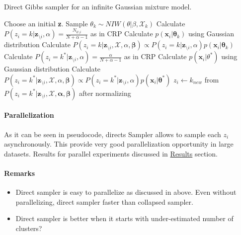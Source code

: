 \documentclass[a4paper]{article}
\begin{document}
\begin{algorithm}
  \caption{Direct Gibbs sampler for an infinite Gaussian mixture model.}\label{directgibbs}
  \begin{algorithmic}[1]
    
  \State Choose an initial \textbf{z}.
   
     
            \State Sample $\theta_k \sim NIW(\theta|\beta,\mathcal{X}_{k})$ 
    \EndFor
         
            \State Calculate $P(z_i = k | \mathbf{z}_{\setminus i},\alpha) = \frac{N_{k\setminus i}}{N+\alpha-1}$ as in CRP
            \State Calculate $p(\mathbf{x}_i|\mathbf{\theta}_k)$ using Gaussian distribution
            \State Calculate $P(z_i = k | \mathbf{z}_{\setminus i},\mathcal{X},\alpha,\mathbf{\beta}) \propto P(z_i = k | \mathbf{z}_{\setminus i},\alpha)p(\mathbf{x}_i|\mathbf{\theta}_k)$
        \EndFor
        \State Calculate $P(z_i = k^* | \mathbf{z}_{\setminus i},\alpha) = \frac{\alpha}{N+\alpha-1}$ as in CRP 
        \State Calculate $p(\mathbf{x}_i|\theta^*)$ using Gaussian distribution
        \State Calculate $P(z_i = k^* | \mathbf{z}_{\setminus i},\mathcal{X},\alpha, \mathbf{\beta}) \propto P(z_i = k^* | \mathbf{z}_{\setminus i},\alpha)p(\mathbf{x}_i|\mathbf{\theta}^*)$
        \State $z_i \gets k_{new}$ from $P(z_i = k^* | \mathbf{z}_{\setminus i},\mathcal{X},\mathbf{\alpha},\mathbf{\beta})$ after normalizing
    \EndFor
  \EndFor
  \end{algorithmic}
\end{algorithm}



\paragraph{Parallelization}

As it can be seen in pseudocode, directs Sampler allows to sample each
\(z_i\) asynchronously. This provide very good parallelization
opportunity in large datasets. Results for parallel experiments
discussed in \protect\hyperlink{ux20Results}{Results} section.


\paragraph{Remarks}

\begin{itemize}
\item
  Direct sampler is easy to parallelize as discussed in above. Even
  without parallelizing, direct sampler faster than collapsed sampler.
\item
  Direct sampler is better when it starts with under-estimated number of
  clusters?
\end{itemize}
\end{document}
